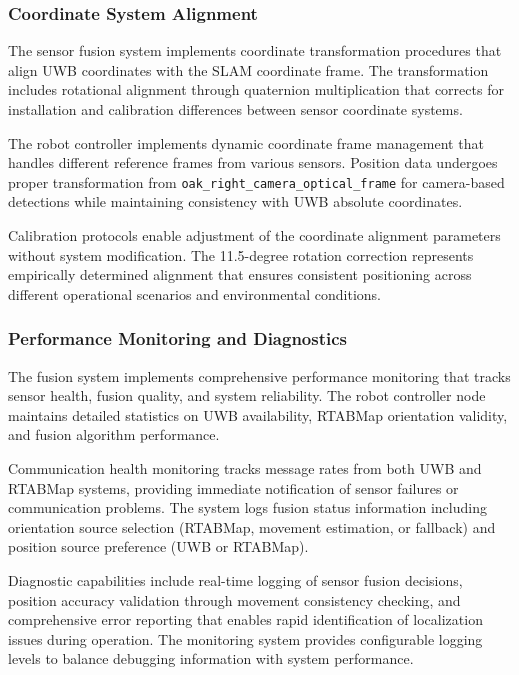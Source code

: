 \subsubsection{Coordinate System Alignment}

The sensor fusion system implements coordinate transformation procedures that align UWB coordinates with the SLAM coordinate frame. The transformation includes rotational alignment through quaternion multiplication that corrects for installation and calibration differences between sensor coordinate systems.

The robot controller implements dynamic coordinate frame management that handles different reference frames from various sensors. Position data undergoes proper transformation from \texttt{oak\_right\_camera\_optical\_frame} for camera-based detections while maintaining consistency with UWB absolute coordinates.

Calibration protocols enable adjustment of the coordinate alignment parameters without system modification. The 11.5-degree rotation correction represents empirically determined alignment that ensures consistent positioning across different operational scenarios and environmental conditions.

\subsubsection{Performance Monitoring and Diagnostics}

The fusion system implements comprehensive performance monitoring that tracks sensor health, fusion quality, and system reliability. The robot controller node maintains detailed statistics on UWB availability, RTABMap orientation validity, and fusion algorithm performance.

Communication health monitoring tracks message rates from both UWB and RTABMap systems, providing immediate notification of sensor failures or communication problems. The system logs fusion status information including orientation source selection (RTABMap, movement estimation, or fallback) and position source preference (UWB or RTABMap).

Diagnostic capabilities include real-time logging of sensor fusion decisions, position accuracy validation through movement consistency checking, and comprehensive error reporting that enables rapid identification of localization issues during operation. The monitoring system provides configurable logging levels to balance debugging information with system performance.



